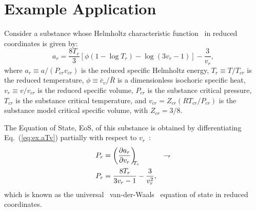 \section{Example Application}

    Consider         a         substance         whose         Helmholtz          characteristic
    function~\cite{1986-JonesJB+HawkinsGA-Wiley} in reduced coordinates is given by:
    \begin{equation}
        a_r = \frac{8T_r}{3}\left[
                  \phi\left(1 - \log T_r\right) - \log(3v_r - 1)
              \right] - \frac{3}{v_r},
        \label{eq:ex.aTv}
    \end{equation}
    \noindent where $a_r \equiv a / (P_{cr}v_{cr})$ is the reduced specific Helmholtz energy,
    $T_r \equiv T / T_{cr}$ is the reduced temperature, $\phi \equiv \bar{c}_v / \bar{R}$ is a
    dimensionless isochoric specific heat, $v_r \equiv v / v_{cr}$ is the reduced specific
    volume, $P_{cr}$ is the substance critical pressure, $T_{cr}$ is the substance critical
    temperature, and $v_{cr} = Z_{cr}(RT_{cr}/P_{cr})$ is the substance model critical specific
    volume, with $Z_{cr} = 3/8$.

    The  Equation  of  State,  EoS,  of  this   substance   is   obtained   by   differentiating
    Eq.~(\ref{eq:ex.aTv}) partially with respect to $v_r$~\cite{1986-JonesJB+HawkinsGA-Wiley}:
    \begin{align}
        P_r & = \left(\frac{\partial {{a_r}}}{\partial {{v_r}}}\right)_{\!\!\!{T_r}} & \rightharpoondown\\
        P_r & = \frac{8T_r}{3v_r - 1} - \frac{3}{v_r^2}, \label{eq:ex.EoS}
    \end{align}
    \noindent    which    is    known    as     the     universal~\cite{1899-MaxwellJC-Longmans}
    van-der-Waals~\cite{2006-BejanA-Wiley,                           2013-CengelYA+BolesMA-AMGH,
    1986-JonesJB+HawkinsGA-Wiley} equation of state in reduced coordinates.


